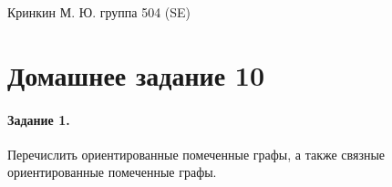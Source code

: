 \documentclass[a4paper,12pt]{article}
\begin{document}
\sloppy

\lstset{
	basicstyle=\small,
	stringstyle=\ttfamily,
	showstringspaces=false,
	columns=fixed,
	breaklines=true,
	numbers=right,
	numberstyle=\tiny
}

\newtheorem{Def}{Определение}[section]
\newtheorem{Th}{Теорема}
\newtheorem{Lem}[Th]{Лемма}
\newenvironment{Proof}
	{\par\noindent{\bf Доказательство.}}
	{\hfill$\scriptstyle\blacksquare$}
\newenvironment{Solution}
	{\par\noindent{\bf Решение.}}
	{\hfill$\scriptstyle\blacksquare$}


\begin{flushright}
	Кринкин М. Ю. группа 504 (SE)
\end{flushright}

\section{Домашнее задание 10}

\paragraph{Задание 1.} Перечислить ориентированные помеченные графы, а также связные ориентированные помеченные графы.
\end{document}
